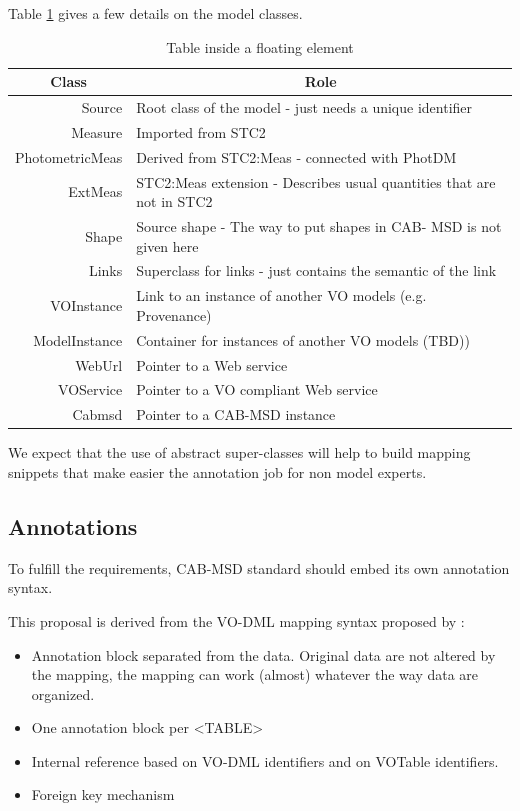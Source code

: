 \documentclass[11pt,a4paper]{ivoa}
\begin{document}
Table \ref{table:tclass} gives a few details on the model classes.

\begin{table}[H]
\begin{tabular}{|r|p{19em}|}
  \hline
          \multicolumn{1}{|c}{\bfseries Class} &
          \multicolumn{1}{|c|}{\bfseries Role}
          \\
\hline
Source & 
Root class of the model - just needs a unique identifier
\\  
\hline
Measure & 
Imported from STC2 
\\
\hline
PhotometricMeas & 
Derived from STC2:Meas - connected with PhotDM 
\\
\hline
ExtMeas & 
STC2:Meas extension - Describes usual quantities that are not in STC2  
\\
\hline
Shape & 
Source shape - The way to put shapes in  CAB-
MSD is not given here
\\
\hline
Links & 
Superclass for links - just contains the semantic of the link
\\
\hline
VOInstance & 
Link to an instance of another VO models (e.g. Provenance)
\\
\hline
ModelInstance & 
Container for instances of another VO models (TBD))
\\
\hline
WebUrl & 
Pointer to a Web service 
\\
\hline
VOService & 
Pointer to a VO compliant Web service 
\\
\hline
Cabmsd & 
Pointer to a CAB-MSD instance 
\\
\hline
\end{tabular}
\caption{Table inside a floating element}
\label{table:tclass}
\end{table}

We expect that the use of abstract super-classes will help to build mapping snippets that make easier the annotation job for non model experts.

\subsection{Annotations}

To fulfill the requirements,  CAB-MSD standard should embed its own annotation syntax. 

This proposal is derived from the VO-DML mapping syntax proposed by \citep{wd:wdmapping}:
\begin{itemize}
\item Annotation block separated from the data. Original data are not altered by the mapping, the mapping can work (almost)  whatever the way data are organized.
\item One annotation block per <TABLE>
\item Internal reference based on VO-DML identifiers and on VOTable identifiers.
\item Foreign key mechanism
\end{itemize}
\end{document}
